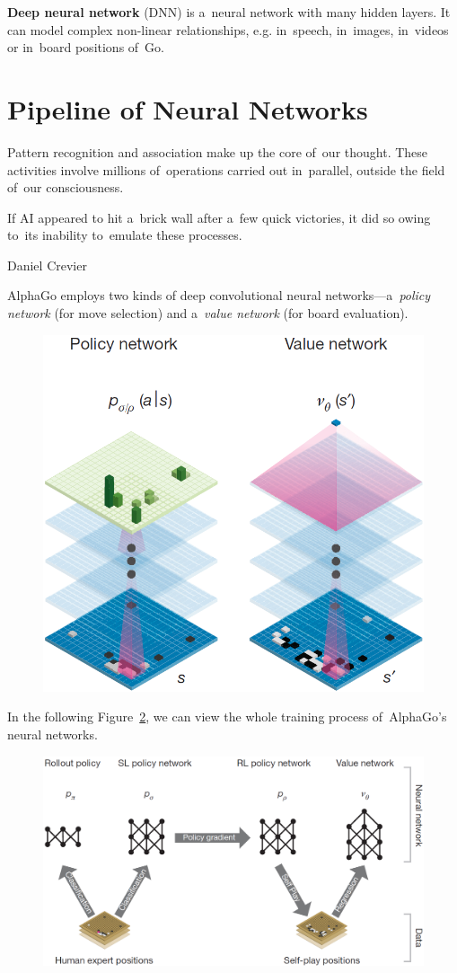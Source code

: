 \textbf{Deep neural network} (DNN) is a~neural network with many hidden layers.
It can model complex non-linear relationships, e.g. in~speech, in~images, in~videos or in~board positions of~Go.

\section{Pipeline of Neural Networks}
\epigraph{
  Pattern recognition and association make up the core of~our thought.
  These activities involve millions of~operations carried out in~parallel, outside the field of~our consciousness.

  If AI appeared to hit a~brick wall after a~few quick victories, it did so owing to~its inability to~emulate these processes.
}{Daniel Crevier}
AlphaGo employs two kinds of deep convolutional neural networks---a~\emph{policy network} (for move selection) and a~\emph{value network} (for board evaluation).
\begin{figure}[H]
  \centering
  \includegraphics[width=.5\textwidth]{../img/policy_and_value_network.png}
  \label{fig:policy_vs_value_nets}
\end{figure}

In the following Figure~\ref{fig:neural_nets_pipeline}, we can view the whole training process of~AlphaGo's neural networks.
\begin{figure}[H]
  \centering
  \includegraphics[width=.7\textwidth]{../img/neural_nets_pipeline.png}
  \label{fig:neural_nets_pipeline}
\end{figure}

